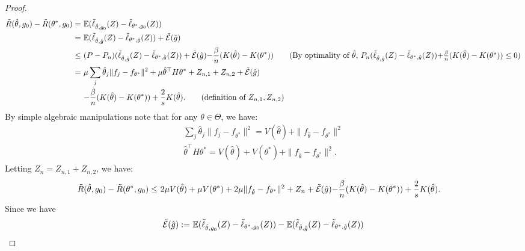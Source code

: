 \documentclass[12pt]{extarticle} %
\newcommand{\E}{\mathbb{E}}
\newcommand{\error}{\ensuremath{\textsc{Error}}}
\begin{document}
\begin{proof}
\begin{align*}
    \tilde{R}(\hat{\theta}, g_0) - \tilde{R}(\theta^*, g_0) =~& 
    \E(\tilde{\ell}_{\hat{\theta},g_0}(Z) - \tilde{\ell}_{\theta^*,g_0}(Z))\\
    =~& 
    \E(\tilde{\ell}_{\hat{\theta},\hat{g}}(Z) - \tilde{\ell}_{\theta^*,\hat{g}}(Z)) + \tilde{\cal E}(\hat{g})\\
    \leq~& 
    (P - P_n)(\tilde{\ell}_{\hat{\theta}, \hat{g}}(Z) - \tilde{\ell}_{\theta^*, \hat{g}}(Z)) + \tilde{\cal E}(\hat{g}) 
    {-\frac{\beta}{n}(K(\hat{\theta})-K(\theta^*))}
    \tag{By optimality of $\hat{\theta}$, $P_n(\tilde{\ell}_{\hat{\theta}, \hat{g}}(Z) - \tilde{\ell}_{\theta^*, \hat{g}}(Z)) {+ \frac{\beta}{n}(K(\hat{\theta})-K(\theta^*))}\leq 0$}\\
    =~& \mu\sum_j \hat{\theta}_j \|f_j - f_{\theta^*}\|^2 + \mu \hat{\theta}^\top H\theta^*+ Z_{n,1} + Z_{n,2} + \tilde{\cal E}(\hat{g})\\
    ~& {-\frac{\beta}{n}(K(\hat{\theta})-K(\theta^*)) + \frac{2}{s}K(\hat{\theta})}.
    \tag{definition of $Z_{n,1}, Z_{n,2}$}
\end{align*}
By simple algebraic manipulations note that for any $\theta\in \Theta$, we have:
\begin{align*}
    \sum_j \hat{\theta}_j \|f_j - f_{\theta^*}\|^2 = V(\hat{\theta}) + \|f_{\hat{\theta}} - f_{\theta^*}\|^2 \\
    \hat{\theta}^\top H \theta^* = V(\hat{\theta}) + V(\theta^*) + \|f_{\hat{\theta}} - f_{\theta^*}\|^2.
\end{align*}
Letting $Z_n=Z_{n,1} + Z_{n,2}$, we have:
\begin{align*}
    \tilde{R}(\hat{\theta}, g_0) - \tilde{R}(\theta^*, g_0) \leq~& 2\mu V(\hat{\theta}) + \mu V(\theta^*) + 2\mu \|f_{\hat{\theta}} - f_{\theta^*}\|^2 + Z_n+ \tilde{\cal E}(\hat{g}) {-\frac{\beta}{n}(K(\hat{\theta})-K(\theta^*)) + \frac{2}{s}K(\hat{\theta})}.
\end{align*}
Since we have
\begin{align*}
    \tilde{\cal E}(\hat{g}) :=~& \E(\tilde{\ell}_{\hat{\theta},g_0}(Z) - \tilde{\ell}_{\theta^*,g_0}(Z)) - \E(\tilde{\ell}_{\hat{\theta},\hat{g}}(Z) - \tilde{\ell}_{\theta^*,\hat{g}}(Z)) \\

\end{align*}
\end{proof}
\end{document}

